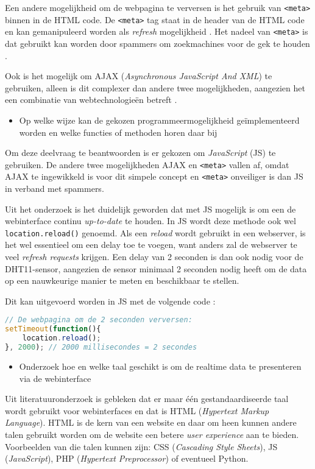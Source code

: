 Een andere mogelijkheid om de webpagina te verversen is het gebruik van \verb|<meta>| binnen in de HTML code. 
De \verb|<meta>| tag staat in de header van de HTML code en kan gemanipuleerd worden als \textit{refresh} mogelijkheid \cite{lindgren2001measurement}. 
Het nadeel van \verb|<meta>| is dat gebruikt kan worden door spammers om zoekmachines voor de gek te houden \cite{Meta}. 

Ook is het mogelijk om AJAX (\textit{Asynchronous JavaScript And XML}) te gebruiken, alleen is dit complexer dan andere twee mogelijkheden, 
aangezien het een combinatie van webtechnologieën betreft \cite{singh2012ajax}.  
\begin{itemize}
    \item[\ding{226}] Op welke wijze kan de gekozen programmeermogelijkheid geïmplementeerd worden en welke functies of methoden horen daar bij
\end{itemize}
Om deze deelvraag te beantwoorden is er gekozen om \textit{JavaScript} (JS) te gebruiken. 
De andere twee mogelijkheden AJAX en \verb|<meta>| vallen af, omdat AJAX te ingewikkeld is voor dit simpele concept en \verb|<meta>| onveiliger is dan JS in verband met spammers. 

Uit het onderzoek is het duidelijk geworden dat met JS mogelijk is om een de webinterface continu \textit{up-to-date} te houden. 
In JS wordt deze methode ook wel \verb|location.reload()| genoemd. 
Als een \textit{reload} wordt gebruikt in een webserver, is het wel essentieel om een delay toe te voegen, want anders zal de webserver te veel \textit{refresh requests} krijgen. 
Een delay van 2 seconden is dan ook nodig voor de DHT11-sensor, aangezien de sensor minimaal 2 seconden nodig heeft om de data op een nauwkeurige manier te meten en beschikbaar te stellen. 

Dit kan uitgevoerd worden in JS met de volgende code \cite{freecodecamp}:
\begin{lstlisting}[language=JavaScript]
// De webpagina om de 2 seconden verversen:
setTimeout(function(){
    location.reload();
}, 2000); // 2000 millisecondes = 2 secondes
\end{lstlisting}
\begin{itemize}
    \item[\ding{226}] Onderzoek hoe en welke taal geschikt is om de realtime data te presenteren via de webinterface
\end{itemize}
Uit literatuuronderzoek \cite{Krause2016} is gebleken dat er maar één gestandaardiseerde taal wordt gebruikt voor webinterfaces en dat is HTML (\textit{Hypertext Markup Language}). 
HTML is de kern van een website en daar om heen kunnen andere talen gebruikt worden om de website een betere \textit{user experience} aan te bieden. 
Voorbeelden van die talen kunnen zijn: CSS (\textit{Cascading Style Sheets}), JS (\textit{JavaScript}), PHP (\textit{Hypertext Preprocessor}) of eventueel Python.

